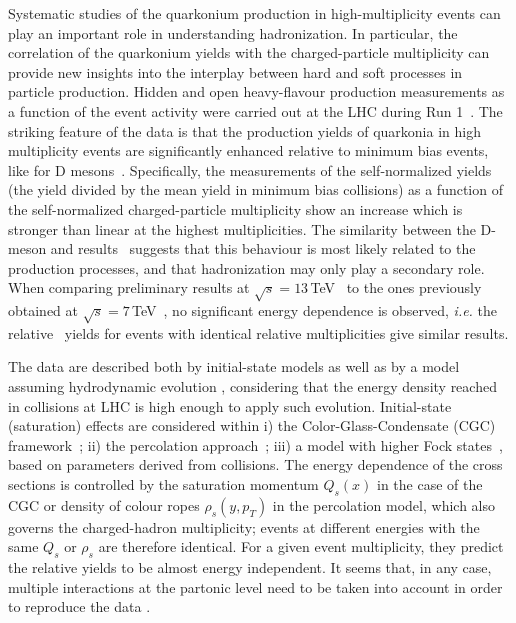 \documentclass[../report.tex]{subfiles}
\begin{document}
Systematic studies of the quarkonium production in high-multiplicity \pp events can play an important role in understanding hadronization.
In particular, the correlation of the quarkonium yields with the charged-particle multiplicity can provide new insights into the interplay between hard and soft processes in particle production.
Hidden and open heavy-flavour production measurements as a function of the event activity were carried out  at the LHC during Run 1~\cite{Abelev:2012rz,Chatrchyan:2013nza}.
The striking feature of the data is that the production yields of quarkonia in high multiplicity events are significantly enhanced relative to minimum bias events, like for D mesons~\cite{Adam:2015ota}.
Specifically, the measurements of the self-normalized yields (the yield divided by the mean yield in minimum bias collisions) as a function of the self-normalized charged-particle multiplicity show an increase which is stronger than linear at the highest multiplicities.
The similarity between the D-meson and \PJgy results~\cite{Abelev:2012rz,Adam:2015ota} suggests that this behaviour is most likely related to the production processes, and that hadronization may only play a secondary role.
When comparing \PJgy preliminary results at $\sqrt{s}=13$\,TeV~\cite{Weber:2017hhm} to the ones previously obtained at $\sqrt{s} = 7$\,TeV~\cite{Abelev:2012rz}, no significant energy dependence is observed, {\it i.e.} the relative \PJgy~yields for events with identical relative multiplicities give similar results.

The data are described both by initial-state models as well as by a model assuming hydrodynamic evolution \cite{Werner:2013tya}, considering that the energy density reached in \pp collisions at LHC is high enough to apply such evolution.
Initial-state (saturation) effects are considered within
i) the Color-Glass-Condensate (CGC) framework~\cite{Ma:2018bax}; ii) the percolation approach~\cite{Ferreiro:2012fb,Ferreiro:2015gea}; iii) a model with higher Fock states~\cite{Kopeliovich:2013yfa}, based on parameters derived from \pPb collisions.
The energy dependence of the cross sections is controlled by the saturation momentum $Q_s(x)$ in the case of the CGC or density of colour ropes $\rho_s(y,p_T)$ in the percolation model, which also governs the charged-hadron multiplicity; events at different energies with the same $Q_s$ or $\rho_s$ are therefore identical.
For a given event multiplicity, they predict the relative yields to be almost energy independent.
It seems that, in any case, multiple interactions at the partonic level need to be taken into account in order to reproduce the data \cite{Sjostrand:2014zea,Skands:2014pea,Sjostrand:2017cdm}.
\end{document}
